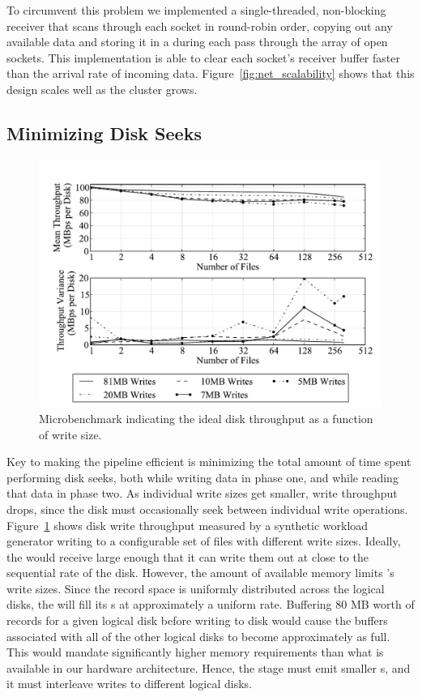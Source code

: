 To circumvent this problem we implemented a single-threaded, non-blocking
receiver that scans through each socket in round-robin order, copying out any
available data and storing it in a \nodebuffer during each pass through the
array of open sockets.  This implementation is able to clear each socket's
receiver buffer faster than the arrival rate of incoming data.
Figure~\ref{fig:net_scalability} shows that this design scales well as the
cluster grows.

\subsection{Minimizing Disk Seeks}
\label{sec:diskseeks}

\begin{figure}
  \centering
  \includegraphics[width=\columnwidth]{tritonsort/graphs/write_scalability_throughput_receiverbench}
  \caption{\label{fig:micro_write_bw}Microbenchmark indicating the ideal disk throughput as a function of
           write size.}
\end{figure}

Key to making the \tritonsort pipeline efficient is minimizing the total amount
of time spent performing disk seeks, both while writing data in phase one, and
while reading that data in phase two.  As individual write sizes get smaller,
write throughput drops, since the disk must occasionally seek between
individual write operations.  Figure~\ref{fig:micro_write_bw} shows disk write
throughput measured by a synthetic workload generator writing to a configurable
set of files with different write sizes.  Ideally, the \writer would receive
\writerbuffers large enough that it can write them out at close to the
sequential rate of the disk.  However, the amount of available memory limits
\tritonsort's write sizes.  Since the record space is uniformly distributed
across the logical disks, the \ldts will fill its \ldbuffer{}s at approximately
a uniform rate.  Buffering 80 MB worth of records for a given logical disk
before writing to disk would cause the buffers associated with all of the other
logical disks to become approximately as full.  This would mandate
significantly higher memory requirements than what is available in our hardware
architecture.  Hence, the \ldts stage must emit smaller \writerbuffer{}s, and
it must interleave writes to different logical disks.

